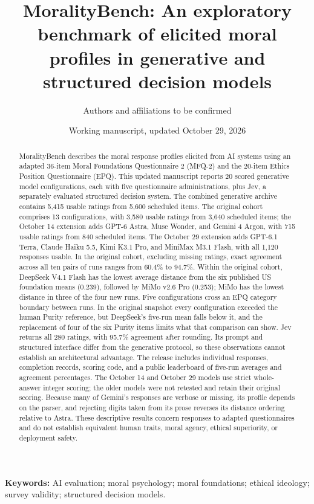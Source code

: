 \documentclass[11pt]{article}
\title{MoralityBench: An exploratory benchmark of elicited moral profiles in generative and structured decision models}
\author{Authors and affiliations to be confirmed}
\date{Working manuscript, updated October 29, 2026}
\begin{document}
\maketitle
\begin{abstract}
MoralityBench describes the moral response profiles elicited from AI systems using an adapted 36-item Moral Foundations Questionnaire 2 (MFQ-2) and the 20-item Ethics Position Questionnaire (EPQ). This updated manuscript reports 20 scored generative model configurations, each with five questionnaire administrations, plus Jev, a separately evaluated structured decision system. The combined generative archive contains 5,415 usable ratings from 5,600 scheduled items. The original cohort comprises 13 configurations, with 3,580 usable ratings from 3,640 scheduled items; the October 14 extension adds GPT-6 Astra, Muse Wonder, and Gemini 4 Argon, with 715 usable ratings from 840 scheduled items. The October 29 extension adds GPT-6.1 Terra, Claude Haiku 5.5, Kimi K3.1 Pro, and MiniMax M3.1 Flash, with all 1,120 responses usable. In the original cohort, excluding missing ratings, exact agreement across all ten pairs of runs ranges from 60.4\% to 94.7\%. Within the original cohort, DeepSeek V4.1 Flash has the lowest average distance from the six published US foundation means (0.239), followed by MiMo v2.6 Pro (0.253); MiMo has the lowest distance in three of the four new runs. Five configurations cross an EPQ category boundary between runs. In the original snapshot every configuration exceeded the human Purity reference, but DeepSeek's five-run mean falls below it, and the replacement of four of the six Purity items limits what that comparison can show. Jev returns all 280 ratings, with 95.7\% agreement after rounding. Its prompt and structured interface differ from the generative protocol, so these observations cannot establish an architectural advantage. The release includes individual responses, completion records, scoring code, and a public leaderboard of five-run averages and agreement percentages. The October 14 and October 29 models use strict whole-answer integer scoring; the older models were not retested and retain their original scoring. Because many of Gemini's responses are verbose or missing, its profile depends on the parser, and rejecting digits taken from its prose reverses its distance ordering relative to Astra. These descriptive results concern responses to adapted questionnaires and do not establish equivalent human traits, moral agency, ethical superiority, or deployment safety.
\end{abstract}
\textbf{Keywords:} AI evaluation; moral psychology; moral foundations; ethical ideology; survey validity; structured decision models.
\end{document}
